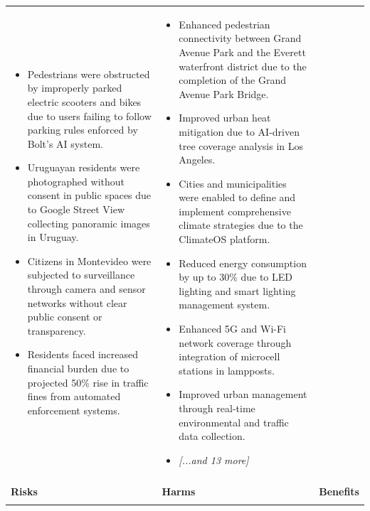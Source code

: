 \begin{longtable}{p{5.2cm}|p{5.2cm}|p{5.2cm}}
\begin{itemize}[leftmargin=*, nosep, before=\vspace{-0.5\baselineskip}, after=\vspace{-0.5\baselineskip}]
\footnotesize
\item Pedestrians were obstructed by improperly parked electric scooters and bikes due to users failing to follow parking rules enforced by Bolt's AI system.
\item Uruguayan residents were photographed without consent in public spaces due to Google Street View collecting panoramic images in Uruguay.
\item Citizens in Montevideo were subjected to surveillance through camera and sensor networks without clear public consent or transparency.
\item Residents faced increased financial burden due to projected 50\% rise in traffic fines from automated enforcement systems.
\end{itemize} & \begin{itemize}[leftmargin=*, nosep, before=\vspace{-0.5\baselineskip}, after=\vspace{-0.5\baselineskip}] 
\footnotesize
\item Enhanced pedestrian connectivity between Grand Avenue Park and the Everett waterfront district due to the completion of the Grand Avenue Park Bridge.
\item Improved urban heat mitigation due to AI-driven tree coverage analysis in Los Angeles.
\item Cities and municipalities were enabled to define and implement comprehensive climate strategies due to the ClimateOS platform.
\item Reduced energy consumption by up to 30\% due to LED lighting and smart lighting management system.
\item Enhanced 5G and Wi-Fi network coverage through integration of microcell stations in lampposts.
\item Improved urban management through real-time environmental and traffic data collection.
\item \textit{[...and 13 more]}
\end{itemize} \\
\pagebreak
\multicolumn{3}{l}{\textbf{\large Government Services and Administration} \textit{(N=22 articles)}} \\
\midrule
\textbf{Risks} & \textbf{Harms} & \textbf{Benefits} \\
\midrule
\begin{itemize}[leftmargin=*, nosep, before=\vspace{-0.5\baselineskip}, after=\vspace{-0.5\baselineskip}] 

\end{itemize}
\end{longtable}
